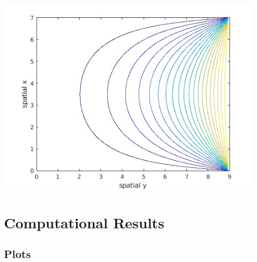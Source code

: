 \documentclass{amsart}
\begin{document}
	\includegraphics[scale=0.24]{EL20}\\

\section{Computational Results}

\subsection{Plots}
\end{document}
